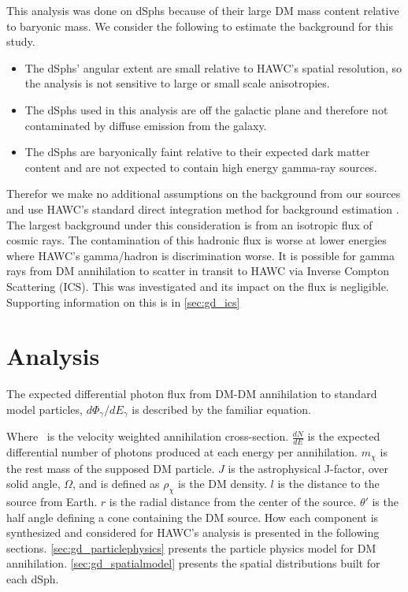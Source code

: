 This analysis was done on dSphs because of their large DM mass content relative to baryonic mass.
We consider the following to estimate the background for this study.

\begin{itemize}
    \item The dSphs' angular extent are small relative to HAWC's spatial resolution, so the analysis is not sensitive to large or small scale anisotropies.
    \item The dSphs used in this analysis are off the galactic plane and therefore not contaminated by diffuse emission from the galaxy.
    \item The dSphs are baryonically faint relative to their expected dark matter content and are not expected to contain high energy gamma-ray sources.
\end{itemize}

Therefor we make no additional assumptions on the background from our sources and use HAWC's standard direct integration method for background estimation \cite{Abeysekara_2017}.
The largest background under this consideration is from an isotropic flux of cosmic rays.
The contamination of this hadronic flux is worse at lower energies where HAWC's gamma/hadron is discrimination worse.
It is possible for gamma rays from DM annihilation to scatter in transit to HAWC via Inverse Compton Scattering (ICS).
This was investigated and its impact on the flux is negligible.
Supporting information on this is in \cref{sec:gd_ics}

\section{Analysis}\label{sec:gd_analysis}

The expected differential photon flux from DM-DM annihilation to standard model
particles, $d\Phi_{\gamma}/dE_{\gamma}$ is described by the familiar equation.
\iddmannilation

Where \sv~is the velocity weighted annihilation cross-section.
$\frac{dN}{dE}$ is the expected differential number of photons produced at each energy per annihilation.
$m_\chi$ is the rest mass of the supposed DM particle.
$J$ is the astrophysical J-factor, over solid angle, $\Omega$, and is defined as
\jfactor
$\rho_{\chi}$ is the DM density.
$l$ is the distance to the source from Earth.
$r$ is the radial distance from the center of the source.
$\theta'$ is the half angle defining a cone containing the DM source.
How each component is synthesized and considered for HAWC's analysis is presented in the following sections.
\cref{sec:gd_particlephysics} presents the particle physics model for DM annihilation.
\cref{sec:gd_spatialmodel} presents the spatial distributions built for each dSph.

